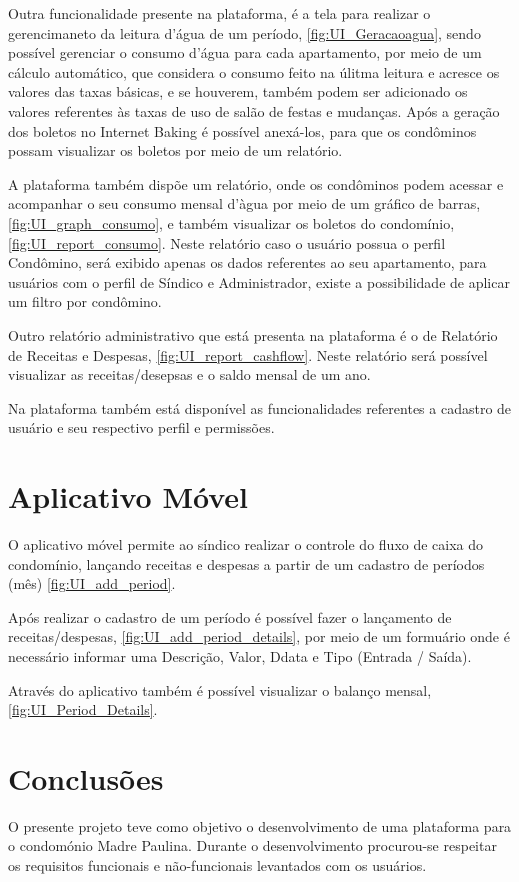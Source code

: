 \documentclass[12pt]{article}
\begin{document}
Outra funcionalidade presente na plataforma, é a tela para realizar o gerencimaneto da leitura d’água de um período, \autoref{fig:UI_Geracaoagua}, sendo possível gerenciar o consumo d’água para cada apartamento, por meio de um cálculo automático, que considera o consumo feito na úlitma leitura e acresce os valores das taxas básicas, e se houverem, também podem ser adicionado os valores referentes às taxas de uso de salão de festas e mudanças. Após a geração dos boletos no Internet Baking é possível anexá-los, para que os condôminos possam visualizar os boletos por meio de um relatório.

A plataforma também dispõe um relatório, onde os condôminos podem acessar e acompanhar o seu consumo mensal d'àgua por meio de um gráfico de barras, \autoref{fig:UI_graph_consumo}, e também visualizar os boletos do condomínio, \autoref{fig:UI_report_consumo}. Neste relatório caso o usuário possua o perfil Condômino, será exibido apenas os dados referentes ao seu apartamento, para usuários com o perfil de Síndico e Administrador, existe a possibilidade de aplicar um filtro por condômino.

Outro relatório administrativo que está presenta na plataforma é o de Relatório de Receitas e Despesas, \autoref{fig:UI_report_cashflow}. Neste relatório será possível visualizar as receitas/desepsas e o saldo mensal de um ano.

Na plataforma também está disponível as funcionalidades referentes a cadastro de usuário e seu respectivo perfil e permissões.

\section{Aplicativo Móvel}
\label{mobile_application}
O aplicativo móvel permite ao síndico realizar o controle do fluxo de caixa do condomínio, lançando receitas e despesas a partir de um cadastro de períodos (mês) \autoref{fig:UI_add_period}.

Após realizar o cadastro de um período é possível fazer o lançamento de receitas/despesas, \autoref{fig:UI_add_period_details}, por meio de um formuário onde é necessário informar uma Descrição, Valor, Ddata e Tipo (Entrada / Saída).

Através do aplicativo também é possível visualizar o balanço mensal, \autoref{fig:UI_Period_Details}.

\section{Conclusões}
O presente projeto teve como objetivo o desenvolvimento de uma plataforma para o condomónio Madre Paulina. Durante o desenvolvimento procurou-se respeitar os requisitos funcionais e não-funcionais levantados com os usuários. 
\end{document}
